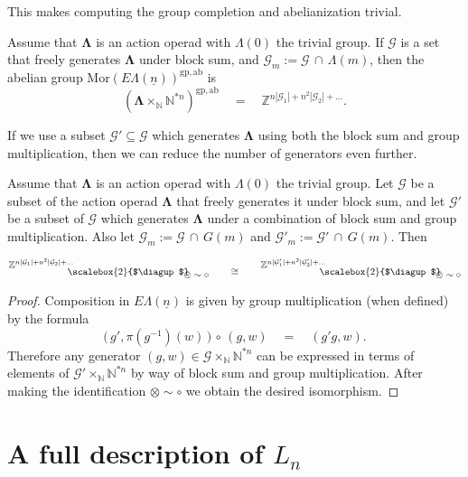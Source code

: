 \documentclass{amsbook} %
\newcommand{\ML}{\mathbf{\Lambda}}
\newcommand{\LL}{\Lambda}
\newcommand{\bigquotient}[2]{ \raisebox{0.75\height}{$#1$} \mkern-12mu\scalebox{2}{$\diagup$}\mkern-10mu \raisebox{-0.5\height}{$#2$} }
\newcommand{\ELn}{E\Lambda(\underline{n})}
\numberwithin{section}{chapter}
\begin{document}
This makes computing the group completion and abelianization trivial. 

\begin{cor} \label{freemorgpab} Assume that $\ML$ is an action operad with $\LL(0)$ the trivial group. If $\mathcal{G}$ is a set that freely generates $\ML$ under block sum, and $\mathcal{G}_m := \mathcal{G} \, \cap \,  \Lambda(m)$, then the abelian group $\mathrm{Mor}(\ELn)^{\mathrm{gp}, \mathrm{ab}}$ is 
\[ (\ML \times_{\mathbb{N}} \mathbb{N}^{\ast n})^{\mathrm{gp}, \mathrm{ab}} \quad = \quad \mathbb{Z}^{ n|\mathcal{G}_1| + n^2 |\mathcal{G}_2| + \ldots}. \]
\end{cor}

If we use a subset $\mathcal{G}' \subseteq \mathcal{G}$ which generates $\ML$ using both the block sum and group multiplication, then we can reduce the number of generators even further.

\begin{cor} Assume that $\ML$ is an action operad with $\LL(0)$ the trivial group. Let $\mathcal{G}$ be a subset of the action operad $\ML$ that freely generates it under block sum, and let $\mathcal{G'}$ be a subset of $\mathcal{G}$ which generates $\ML$ under a combination of block sum and group multiplication. Also let $\mathcal{G}_m := \mathcal{G} \, \cap \,  G(m)$ and $\mathcal{G}'_m := \mathcal{G}' \, \cap \,  G(m)$. Then

\[ \bigquotient{\mathbb{Z}^{n|\mathcal{G}_1| + n^2 |\mathcal{G}_2| + \ldots}}{\otimes \sim \circ} \quad \quad \cong \quad \quad \bigquotient{\mathbb{Z}^{n|\mathcal{G}'_1| + n^2 |\mathcal{G}'_2| + \ldots}}{\otimes \sim \circ} \]
\end{cor}
\begin{proof}
Composition in $\ELn$ is given by group multiplication (when defined) by the formula
\[ \big( \, g', \pi(g^{-1})(w) \, \big) \, \circ \, (g, w) \quad = \quad (g'g, w). \]
Therefore any generator $(g, w) \in \mathcal{G} \times_{\mathbb{N}} \mathbb{N}^{\ast n}$ can be expressed in terms of elements of $\mathcal{G}' \times_{\mathbb{N}} \mathbb{N}^{\ast n}$ by way of block sum and group multiplication. After making the identification $\otimes \sim \circ$ we obtain the desired isomorphism.
\end{proof}

\section{A full description of \texorpdfstring{$L_n$}{L_n}}\label{full_des}
\end{document}
